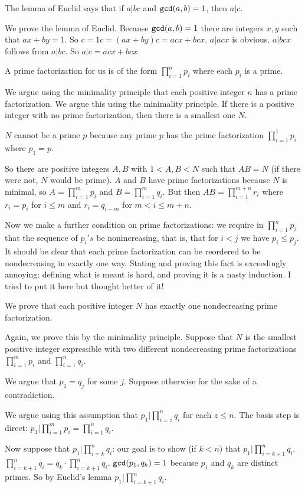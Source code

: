 \documentclass[12pt]{article}
\begin{document}
The lemma of Euclid says that if $a|bc$ and ${\tt gcd}(a,b)=1$, then $a|c$.  

We prove the lemma of Euclid.  Because ${\tt gcd}(a,b)=1$ there are integers $x,y$ such that $ax+by=1$.  So $c=1c=(ax+by)c = acx+bcx$.  $a|acx$ is obvious.  $a|bcx$ follows from $a|bc$.  So $a|c=acx+bcx$.

A prime factorization for us is of the form $\prod_{i=1}^np_i$ where each $p_i$ is a prime.

We argue using the minimality principle that each positive integer $n$ has a prime factorization.  We argue this using the minimality principle.  If there is a positive integer with no prime factorization, then there is a smallest one $N$.

$N$ cannot be a prime $p$ because any prime $p$ has the prime factorization $\prod_{i=1}^1p_i$ where $p_1=p$.

So there are positive integers $A,B$ with $1<A,B<N$ such that $AB=N$ (if there were not, $N$ would be prime).  $A$ and $B$ have prime factorizations because $N$ is minimal,
so $A = \prod_{i=1}^mp_i$ and $B=\prod_{i=1}^mq_i$.  But then $AB= \prod_{i=1}^{m+n}r_i$ where $r_i = p_i$ for $i\leq m$ and $r_i = q_{i-m}$ for $m<i\leq m+n$.

Now we make a further condition on prime factorizations:  we require in $\prod_{i=1}^np_i$ that the sequence of $p_i's$ be nonincreasing, that is, that for $i<j$ we have
$p_i \leq p_j$.  It should be clear that each prime factorization can be reordered to be nondecreasing in exactly one way.  Stating and proving this fact is exceedingly annoying:  defining what is meant is hard, and proving it is a nasty induction.  I tried to put it here but thought better of it!

We prove that each positive integer  $N$ has exactly one nondecreasing prime factorization.

Again, we prove this by the minimality principle.  Suppose that $N$ is the smallest positive integer expressible with two different nondecreasing prime factorizations
$\prod_{i=1}^mp_i$ and $\prod_{i=1}^nq_i$.

We argue that $p_1 = q_j$ for some $j$.  Suppose otherwise for the sake of a contradiction.

We argue using this assumption that $p_1 | \prod_{i=z}^nq_i$ for each $z\leq n$.  The basis step is direct: $p_1 | \prod_{i=1}^mp_i = \prod_{i=1}^nq_i$.

Now suppose that $p_1 | \prod_{i=k}^nq_i$:  our goal is to show (if $k<n$) that $p_1|\prod_{i=k+1}^nq_i$.  $\prod_{i=k+1}^nq_i = q_k\cdot \prod_{i=k+1}^nq_i$.  ${\tt gcd}(p_1,q_k)=1$ because
$p_1$ and $q_k$ are distinct primes.  So by Euclid's lemma $p_1|\prod_{i=k+1}^nq_i$.
\end{document}
